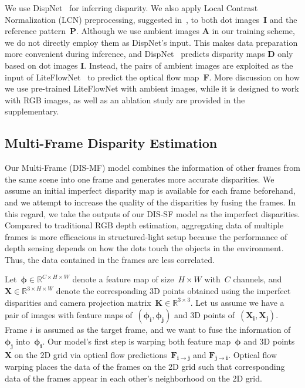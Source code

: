 We use DispNet~\cite{mayer2016large} for inferring disparity. We also apply Local Contrast Normalization (LCN) preprocessing, suggested in~\cite{zhang2018activestereonet, riegler2019connecting}, to both dot images~$\boldsymbol{I}$ and the reference pattern~$\boldsymbol{P}$. Although we use ambient images $\boldsymbol{A}$ in our training scheme, we do not directly employ them as DispNet's input. This makes data preparation more convenient during inference, and DispNet~\cite{mayer2016large} predicts disparity maps $\boldsymbol{D}$ only based on dot images $\boldsymbol{I}$. Instead, the pairs of ambient images are exploited as the input of LiteFlowNet~\cite{hui2018liteflownet} to predict the optical flow map~$\boldsymbol{F}$. More discussion on how we use pre-trained LiteFlowNet with ambient images, while it is designed to work with RGB images, as well as an ablation study are provided in the supplementary.

\subsection{Multi-Frame Disparity Estimation} \label{sec:c2_muti-frame}

Our Multi-Frame (DIS-MF) model combines the information of other frames from the same scene into one frame and generates more accurate disparities. We assume an initial imperfect disparity map is available for each frame beforehand, and we attempt to increase the quality of the disparities by fusing the frames. In this regard, we take the outputs of our DIS-SF model as the imperfect disparities. Compared to traditional RGB depth estimation, aggregating data of multiple frames is more efficacious in structured-light setup because the performance of depth sensing depends on how the dots touch the objects in the environment. Thus, the data contained in the frames are less correlated.

Let~$\boldsymbol{\phi} \in \mathbb{R}^{C \times H \times W}$ denote a feature map of size~$H \times W$ with~$C$ channels, and~$\boldsymbol{X} \in \mathbb{R}^{3 \times H \times W}$ denote the corresponding 3D points obtained using the imperfect disparities and camera projection matrix~$\boldsymbol{K} \in \mathbb{R}^{3 \times 3}$. Let us assume we have a pair of images with feature maps of~$(\boldsymbol{\phi_i},\boldsymbol{\phi_j})$ and 3D points of~$(\boldsymbol{X_i},\boldsymbol{X_j})$. Frame $i$ is assumed as the target frame, and we want to fuse the information of~$\boldsymbol{\phi_j}$ into~$\boldsymbol{\phi_i}$. Our model's first step is warping both feature map~$\boldsymbol{\phi}$ and 3D points~$\boldsymbol{X}$ on the 2D grid via optical flow predictions~$\boldsymbol{F_{i \rightarrow j}}$ and $\boldsymbol{F_{j \rightarrow i}}$. Optical flow warping places the data of the frames on the 2D grid such that corresponding data of the frames appear in each other's neighborhood on the 2D grid.

